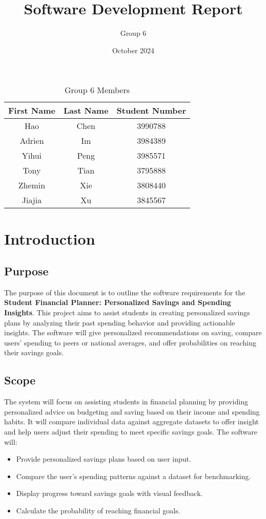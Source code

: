 \documentclass{article}
\title{Software Development Report}
\author{Group 6}
\date{October 2024}
\begin{document}
\maketitle

\begin{table}[ht]
    \centering
    \begin{tabular}{ccc} 
    \toprule
    \textbf{First Name} & \textbf{Last Name} & \textbf{Student Number} \\ 
    \midrule
    Hao    & Chen     & 3990788 \\ 
    Adrien & Im       & 3984389 \\
    Yihui  & Peng     & 3985571 \\ 
    Tony   & Tian     & 3795888 \\ 
    Zhemin & Xie      & 3808440 \\ 
    Jiajia & Xu       & 3845567 \\ 
    \bottomrule
    \end{tabular}
    \caption{Group 6 Members}
    \label{tab:group6_members}
\end{table}

\section{Introduction}
\subsection{Purpose}
The purpose of this document is to outline the software requirements for the \textbf{Student Financial Planner: Personalized Savings and Spending Insights}. This project aims to assist students in creating personalized savings plans by analyzing their past spending behavior and providing actionable insights. The software will give personalized recommendations on saving, compare users' spending to peers or national averages, and offer probabilities on reaching their savings goals.

\subsection{Scope}
The system will focus on assisting students in financial planning by providing personalized advice on budgeting and saving based on their income and spending habits. It will compare individual data against aggregate datasets to offer insight and help users adjust their spending to meet specific savings goals. The software will:
\begin{itemize}
    \item Provide personalized savings plans based on user input.
    \item Compare the user's spending patterns against a dataset for benchmarking.
    \item Display progress toward savings goals with visual feedback.
    \item Calculate the probability of reaching financial goals.
\end{itemize}
\end{document}

